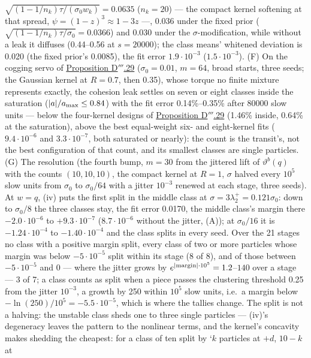 \begin{sloppypar}
$\sqrt{(1 - 1/n_k)\tau/(\sigma_0w_k)} = 0.0635$ ($n_k = 20$) --- the compact kernel softening at that spread,
$\psi = (1 - z)^3\approx1 - 3z$ ---, 0.036 under the fixed prior ($\sqrt{(1 - 1/n_k)\tau/\sigma_0} = 0.0366$) and 0.030
under the $\sigma$-modification, while without a leak it diffuses (0.44--0.56 at $s = 20000$); the class means'
whitened deviation is 0.020 (the fixed prior's 0.0085), the fit error $1.9\cdot10^{-3}$ ($1.5\cdot10^{-3}$). (F) On
the cogging servo of \hyperref[res:thmDppp:29]{Proposition D$'''$.29} ($\sigma_0 = 0.01$, $m = 64$, broad starts,
three seeds; the Gaussian kernel at $R = 0.7$, then 0.35), whose torque no finite mixture represents exactly, the
cohesion leak settles on seven or eight classes inside the saturation ($\lvert a\rvert/a_{\max}\le0.84$) with the fit error
0.14\%--0.35\% after 80000 slow units --- below the four-kernel designs of
\hyperref[res:thmDppp:29]{Proposition D$'''$.29} (1.46\% inside, 0.64\% at the saturation), above the best
equal-weight six- and eight-kernel fits ($9.4\cdot10^{-6}$ and $3.3\cdot10^{-7}$, both saturated or nearly): the count
is the transit's, not the best configuration of that count, and its smallest classes are single particles. (G) The
resolution (the fourth bump, $m = 30$ from the jittered lift of $\vartheta^b(q)$ with the counts $(10,10,10)$, the
compact kernel at $R = 1$, $\sigma$ halved every $10^5$ slow units from $\sigma_0$ to $\sigma_0/64$ with a jitter
$10^{-3}$ renewed at each stage, three seeds). At $w = q$, (iv) puts the first split in the middle class at
$\sigma = 3\lambda^+_2 = 0.121\sigma_0$: down to $\sigma_0/8$ the three classes stay, the fit error 0.0170, the middle
class's margin there $-2.0\cdot10^{-6}$ to $+9.3\cdot10^{-7}$ ($8.7\cdot10^{-6}$ without the jitter, (A)); at
$\sigma_0/16$ it is $-1.24\cdot10^{-4}$ to $-1.40\cdot10^{-4}$ and the class splits in every seed. Over the 21 stages
no class with a positive margin split, every class of two or more particles whose margin was below
$-5\cdot10^{-5}$ split within its stage (8 of 8), and of those between $-5\cdot10^{-5}$ and 0 --- where the jitter
grows by $e^{\lvert \mathrm{margin}\rvert\cdot10^5} = 1.2$--$140$ over a stage --- 3 of 7; a class counts as split when a
piece passes the clustering threshold 0.25 from the jitter $10^{-3}$, a growth by 250 within $10^5$ slow units, i.e.\
a margin below $-\ln(250)/10^5 = -5.5\cdot10^{-5}$, which is where the tallies change. The split is not a halving: the
unstable class sheds one to three single particles --- (iv)'s degeneracy leaves the pattern to the nonlinear terms, and
the kernel's concavity makes shedding the cheapest: for a class of ten split by `$k$ particles at $+d$, $10 - k$ at

\end{sloppypar}
